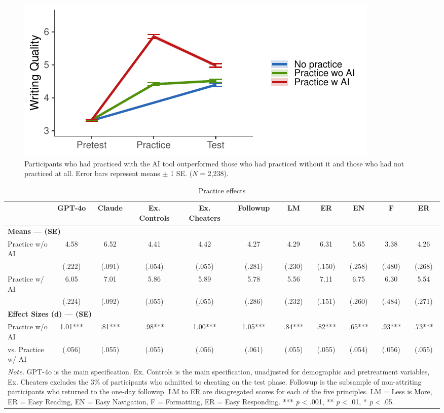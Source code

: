 \documentclass[11pt]{report}
\begin{document}
\begin{append}
\begin{figure}[h]
    \centering    \includegraphics[width=0.75\linewidth]{mainfig_sup.pdf}     
    \caption{Participants who had practiced with the AI tool outperformed those who had practiced without it and those who had not practiced at all.
    Error bars represent means $\pm$ 1 SE.
    (\textit{N} = 2,238).}
    \label{fig:s2_supplement}
\end{figure}


\begin{table}[H]
    \centering
    \caption{Practice effects}
    \footnotesize

\begin{tabular}{lcccccccccc}
\toprule
  & GPT-4o & Claude & Ex. Controls & Ex. Cheaters & Followup & LM & ER & EN & F & ER \\ 
\midrule
\multicolumn{11}{l}{\textbf{Means --- (SE)}} \\ 
\midrule
Practice w/o AI & 4.58 & 6.52 & 4.41 & 4.42 & 4.27 & 4.29 & 6.31 & 5.65 & 3.38 & 4.26 \\ 
 & (.222) & (.091) & (.054) & (.055) & (.281) & (.230) & (.150) & (.258) & (.480) & (.268) \\ 
Practice w/ AI & 6.05 & 7.01 & 5.86 & 5.89 & 5.78 & 5.56 & 7.11 & 6.75 & 6.30 & 5.54 \\ 
 & (.224) & (.092) & (.055) & (.055) & (.286) & (.232) & (.151) & (.260) & (.484) & (.271) \\ 
\midrule
\multicolumn{11}{l}{\textbf{Effect Sizes (d) --- (SE)}} \\ 
\midrule
Practice w/o AI  & 1.01*** & .81*** & .98*** & 1.00*** & 1.05*** & .84*** & .82*** & .65*** & .93*** & .73*** \\ 
 vs. Practice w/ AI& (.056) & (.055) & (.055) & (.056) & (.061) & (.055) & (.055) & (.054) & (.056) & (.055) \\ 
\midrule
\multicolumn{11}{p{16.5cm}}{\textit{Note.} GPT-4o is the main specification. Ex. Controls is the main specification, unadjusted for demographic and pretreatment variables, Ex. Cheaters excludes the 3\% of participants who admitted to cheating on the test phase. Followup is the subsample of non-attriting participants who returned to the one-day followup. LM to ER are disagregated scores for each of the five principles. LM = Less is More, ER = Easy Reading, EN = Easy Navigation, F = Formatting, ER = Easy Responding.  *** \textit{p} < .001, ** \textit{p} < .01, * \textit{p} < .05.}
\vspace{5pt}
\end{tabular}
    \label{tab:s2_practice}
\end{table}


\end{append}
\end{document}
